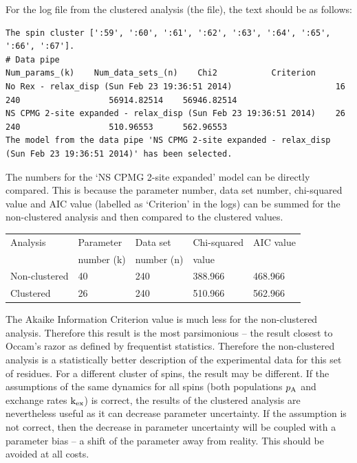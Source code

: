 For the log file from the clustered analysis (the  file), the text should be as follows:

\begin{lstlisting}[basicstyle=\ttfamily \tiny,language=relax_log,numbers=none]
The spin cluster [':59', ':60', ':61', ':62', ':63', ':64', ':65', ':66', ':67'].
# Data pipe                                                        Num_params_(k)    Num_data_sets_(n)    Chi2           Criterion      
No Rex - relax_disp (Sun Feb 23 19:36:51 2014)                     16                240                  56914.82514    56946.82514    
NS CPMG 2-site expanded - relax_disp (Sun Feb 23 19:36:51 2014)    26                240                  510.96553      562.96553      
The model from the data pipe 'NS CPMG 2-site expanded - relax_disp (Sun Feb 23 19:36:51 2014)' has been selected.
\end{lstlisting}

The numbers for the `NS CPMG 2-site expanded' model can be directly compared.
This is because the parameter number, data set number, chi-squared value and AIC value (labelled as `Criterion' in the logs) can be summed for the non-clustered analysis and then compared to the clustered values.

\begin{center}
\begin{tabular}{lllll}
\toprule

Analysis        & Parameter     & Data set      & Chi-squared   & AIC value \\
                & number (k)    & number (n)    & value \\

\midrule

Non-clustered   & 40            & 240           & 388.966       & 468.966 \\
Clustered       & 26            & 240           & 510.966       & 562.966 \\

\bottomrule
\end{tabular}
\end{center}

The Akaike Information Criterion value is much less for the non-clustered analysis.
Therefore this result is the most parsimonious -- the result closest to Occam's razor as defined by frequentist statistics.
Therefore the non-clustered analysis is a statistically better description of the experimental data for this set of residues.
For a different cluster of spins, the result may be different.
If the assumptions of the same dynamics for all spins (both populations $p_{\textrm{A}}$ and exchange rates $\textrm{k}_{\textrm{ex}}$) is correct, the results of the clustered analysis are nevertheless useful as it can decrease parameter uncertainty.
If the assumption is not correct, then the decrease in parameter uncertainty will be coupled with a parameter bias -- a shift of the parameter away from reality.
This should be avoided at all costs.

